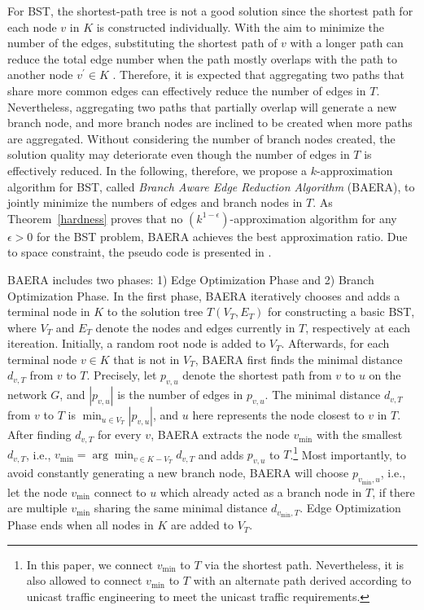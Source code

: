 \documentclass[conference]{IEEEtran}
\begin{document}
For BST, the shortest-path tree is not a good solution since the shortest
path for each node $v$ in $K$ is constructed individually. With the aim to
minimize the number of the edges, substituting the shortest path of $v$ with a
longer path can reduce the total edge number when the path mostly overlaps
with the path to another node $v^{\prime }\in K$ \cite{Takahashi1980}. Therefore, it is expected
that aggregating two paths that share more common edges can effectively
reduce the number of edges in $T$. Nevertheless, aggregating two paths that
partially overlap will generate a new branch node, and more branch nodes are
inclined to be created when more paths are aggregated. Without considering
the number of branch nodes created, the solution quality may deteriorate
even though the number of edges in $T$ is effectively reduced. In the
following, therefore, we propose a $k$-approximation algorithm for BST,
called \textit{Branch Aware Edge Reduction Algorithm} (BAERA), to jointly
minimize the numbers of edges and branch nodes in $T$. As Theorem~\ref {hardness} proves that no $(k^{1-\epsilon })$-approximation algorithm for
any $\epsilon >0$ for the BST problem, BAERA achieves the best approximation
ratio. Due to space constraint, the pseudo code is presented in \cite{DBLP}.


BAERA includes two phases: 1) Edge Optimization Phase and 2) Branch
Optimization Phase. In the first phase, BAERA iteratively chooses and adds a
terminal node in $K$ to the solution tree $T(V_{T},E_{T})$ for constructing
a basic BST, where $V_{T}$ and $E_{T}$ denote the nodes and edges currently
in $T$, respectively at each itereation. Initially, a random root node is added to $V_{T}$.
Afterwards, for each terminal node $v\in K$ that is not in $V_{T}$, BAERA
first finds the minimal distance $d_{v,T}$ from $v$ to $T$. Precisely, let $p_{v,u}$ denote the shortest path from $v$ to $u$ on the network $G$, and $\left \vert p_{v,u}\right \vert $ is the number of edges in $p_{v,u}$. The
minimal distance $d_{v,T}$ from $v$ to $T$ is $\min_{u\in V_{T}}\left \vert
p_{v,u}\right \vert $, and $u$ here represents the node closest to $v$ in $T$. After finding $d_{v,T}$ for every $v$, BAERA extracts the node $v_{\min }$
with the smallest $d_{v,T}$, i.e., $v_{\min }=\arg \min_{v\in
K-V_{T}}d_{v,T} $ and adds $p_{v,u}$ to $T$.\footnote{In this paper, we connect $v_{\min }$ to $T$ via the shortest path.
Nevertheless, it is also allowed to connect $v_{\min }$ to $T$ with an
alternate path derived according to unicast traffic engineering \cite {Agarwal2013} to meet the unicast traffic requirements.} Most importantly,
to avoid constantly generating a new branch node, BAERA will choose $p_{v_{\min },u}$,
i.e., let the node $v_{\min }$ connect to $u$ which already acted as a branch node in $T$, if there are multiple $v_{\min }$ sharing the same minimal distance $d_{v_{\min },T}$. Edge Optimization Phase ends when all nodes in $K$ are
added to $V_{T}$.
\end{document}
